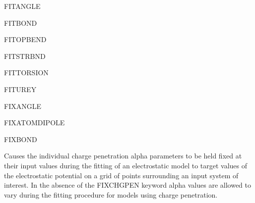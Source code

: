 \documentclass[letterpaper,11pt,english]{sphinxmanual}
\begin{document}
\ignorespaces {}\label{\detokenize{text/keywords:key-fit-angle}}
\sphinxAtStartPar
FIT\sphinxhyphen{}ANGLE

\ignorespaces {}\label{\detokenize{text/keywords:key-fit-bond}}
\sphinxAtStartPar
FIT\sphinxhyphen{}BOND

\ignorespaces {}\label{\detokenize{text/keywords:key-fit-opbend}}
\sphinxAtStartPar
FIT\sphinxhyphen{}OPBEND

\ignorespaces {}\label{\detokenize{text/keywords:key-fit-strbnd}}
\sphinxAtStartPar
FIT\sphinxhyphen{}STRBND

\ignorespaces {}\label{\detokenize{text/keywords:key-fit-torsion}}
\sphinxAtStartPar
FIT\sphinxhyphen{}TORSION

\ignorespaces {}\label{\detokenize{text/keywords:key-fit-urey}}
\sphinxAtStartPar
FIT\sphinxhyphen{}UREY

\ignorespaces {}\label{\detokenize{text/keywords:key-fix-angle}}
\sphinxAtStartPar
FIX\sphinxhyphen{}ANGLE

\ignorespaces {}\label{\detokenize{text/keywords:key-fix-atom-dipole}}
\sphinxAtStartPar
FIX\sphinxhyphen{}ATOM\sphinxhyphen{}DIPOLE

\ignorespaces {}\label{\detokenize{text/keywords:key-fix-bond}}
\sphinxAtStartPar
FIX\sphinxhyphen{}BOND

\ignorespaces {}\label{\detokenize{text/keywords:key-fix-chgpen}}\begin{description}
\sphinxAtStartPar
Causes the individual charge penetration alpha parameters to be held fixed at their input values during the fitting of an electrostatic model to target values of the electrostatic potential on a grid of points surrounding an input system of interest. In the absence of the FIX\sphinxhyphen{}CHGPEN keyword alpha values are allowed to vary during the fitting procedure for models using charge penetration.

\end{description}
\end{document}

